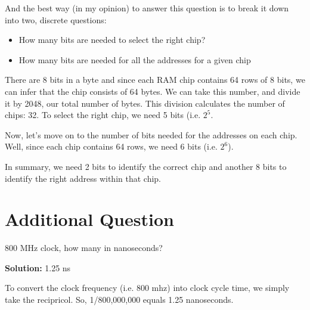 \documentclass{article}
\begin{document}
And the best way (in my opinion) to answer this question is to break it down into two, discrete questions:

\begin{itemize}
    \item How many bits are needed to select the right chip?
    \item How many bits are needed for all the addresses for a given chip
\end{itemize}

There are 8 bits in a byte and since each RAM chip contains 64 rows of 8 bits, we can infer that the chip consists of 64 bytes.  We can take this number, and divide it by 2048, our total number of bytes. This division calculates the number of chips: 32. 
To select the right chip, we need 5 bits (i.e. $2^{5}$. 

Now, let's move on to the number of bits needed for the addresses on each chip. Well, since each chip contains 64 rows, we need 6 bits (i.e. $2^6$). 

In summary, we need 2 bits to identify the correct chip and another 8 bits to identify the right address within that chip.

\setcounter{section}{0}

\section{Additional Question}

800 MHz clock, how many in nanoseconds?

\textbf{Solution:} 1.25 ns

To convert the clock frequency (i.e. 800 mhz) into clock cycle time, we simply take the recipricol. So, 1/800,000,000 equals 1.25 nanoseconds.
\end{document}
